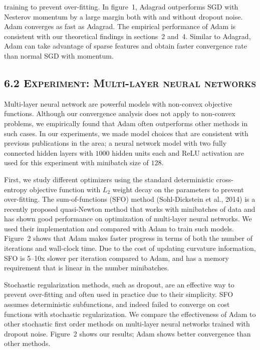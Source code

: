 \documentclass[11pt]{article}
\begin{document}
\vspace{1em}

\noindent
training to prevent over-fitting. In figure~1, Adagrad outperforms
SGD with Nesterov momentum by a large margin both with and
without dropout noise. Adam converges as fast as Adagrad. The
empirical performance of Adam is consistent with our theoretical
findings in sections~2 and~4. Similar to Adagrad, Adam can take
advantage of sparse features and obtain faster convergence rate
than normal SGD with momentum.

\vspace{0.5em}

\subsection*{6.2 \textsc{Experiment: Multi-layer neural networks}}

Multi-layer neural network are powerful models with non-convex
objective functions. Although our convergence analysis does not
apply to non-convex problems, we empirically found that Adam
often outperforms other methods in such cases. In our
experiments, we made model choices that are consistent with
previous publications in the area; a neural network model with
two fully connected hidden layers with $1000$ hidden units each
and ReLU activation are used for this experiment with minibatch
size of $128$.

First, we study different optimizers using the standard
deterministic cross-entropy objective function with $L_2$ weight
decay on the parameters to prevent over-fitting. The
sum-of-functions (SFO) method (Sohl-Dickstein et al., 2014) is a
recently proposed quasi-Newton method that works with minibatches
of data and has shown good performance on optimization of
multi-layer neural networks. We used their implementation and
compared with Adam to train such models. Figure~2 shows that
Adam makes faster progress in terms of both the number of
iterations and wall-clock time. Due to the cost of updating
curvature information, SFO is 5--10x slower per iteration
compared to Adam, and has a memory requirement that is linear in
the number minibatches.

Stochastic regularization methods, such as dropout, are an
effective way to prevent over-fitting and often used in practice
due to their simplicity. SFO assumes deterministic
subfunctions, and indeed failed to converge on cost functions
with stochastic regularization. We compare the effectiveness of
Adam to other stochastic first order methods on multi-layer
neural networks trained with dropout noise. Figure~2 shows our
results; Adam shows better convergence than other methods.
\end{document}
